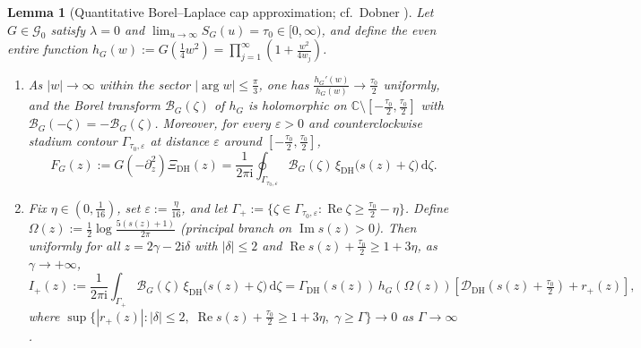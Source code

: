 \documentclass[11pt,a4paper,reqno]{amsart}
\newtheorem{lemma}[theorem]{Lemma}
\theoremstyle{definition}
\theoremstyle{remark}
\numberwithin{equation}{section}
\newcommand{\C}{\mathbb{C}}
\newcommand{\dd}{\mathrm{d}}
\newcommand{\ii}{\mathrm{i}}
\DeclareMathOperator{\Reop}{Re}
\DeclareMathOperator{\Imop}{Im}
\begin{document}
\begin{lemma}[Quantitative Borel--Laplace cap approximation; cf.\ Dobner \cite{dobner2021}]
\label{lem:borel-cap}
Let $G \in \mathcal{G}_0$ satisfy $\lambda = 0$ and $\lim_{u\to\infty} S_G(u) = \tau_0 \in [0, \infty)$, and define the even entire function $h_G(w) := G(\frac{1}{4}w^2) = \prod_{j=1}^{\infty}(1 + \frac{w^2}{4w_j})$.
\begin{enumerate}[label=\textup{(\roman*)},leftmargin=2.0em]
  \item As $|w| \to \infty$ within the sector $|\arg w| \le \frac{\pi}{3}$, one has $\frac{h_G'(w)}{h_G(w)} \to \frac{\tau_0}{2}$ uniformly, and the Borel transform $\mathcal{B}_G(\zeta)$ of $h_G$ is holomorphic on $\C \setminus [-\frac{\tau_0}{2}, \frac{\tau_0}{2}]$ with $\mathcal{B}_G(-\zeta) = -\mathcal{B}_G(\zeta)$. Moreover, for every $\varepsilon > 0$ and counterclockwise stadium contour $\Gamma_{\tau_0,\varepsilon}$ at distance $\varepsilon$ around $[-\frac{\tau_0}{2}, \frac{\tau_0}{2}]$,
  \begin{equation}
    F_G(z) := G(-\partial_z^2)\Xi_{\mathrm{DH}}(z)
    = \frac{1}{2\pi\ii}\oint_{\Gamma_{\tau_0,\varepsilon}} \mathcal{B}_G(\zeta)\,\xi_{\mathrm{DH}}\bigl(s(z) + \zeta\bigr)\,\dd\zeta.
    \label{eq:borel-representation}
  \end{equation}
  \item Fix $\eta \in (0, \frac{1}{16})$, set $\varepsilon := \frac{\eta}{16}$, and let $\Gamma_+ := \{\zeta \in \Gamma_{\tau_0,\varepsilon} : \Reop\zeta \ge \frac{\tau_0}{2} - \eta\}$. Define $\Omega(z) := \frac{1}{2}\log\frac{5(s(z)+1)}{2\pi}$ (principal branch on $\Imop s(z) > 0$). Then uniformly for all $z = 2\gamma - 2\ii\delta$ with $|\delta| \le 2$ and $\Reop s(z) + \frac{\tau_0}{2} \ge 1 + 3\eta$, as $\gamma \to +\infty$,
  \begin{equation}
    I_+(z) := \frac{1}{2\pi\ii}\int_{\Gamma_+} \mathcal{B}_G(\zeta)\,\xi_{\mathrm{DH}}\bigl(s(z) + \zeta\bigr)\,\dd\zeta
    = \Gamma_{\mathrm{DH}}(s(z))\,h_G(\Omega(z))\left[\mathcal{D}_{\mathrm{DH}}\!\left(s(z) + \tfrac{\tau_0}{2}\right) + r_+(z)\right],
    \label{eq:cap-asymptotic}
  \end{equation}
  where $\sup\{|r_+(z)| : |\delta| \le 2,\; \Reop s(z) + \frac{\tau_0}{2} \ge 1 + 3\eta,\; \gamma \ge \Gamma\} \to 0$ as $\Gamma \to \infty$.
\end{enumerate}
\end{lemma}
\end{document}
